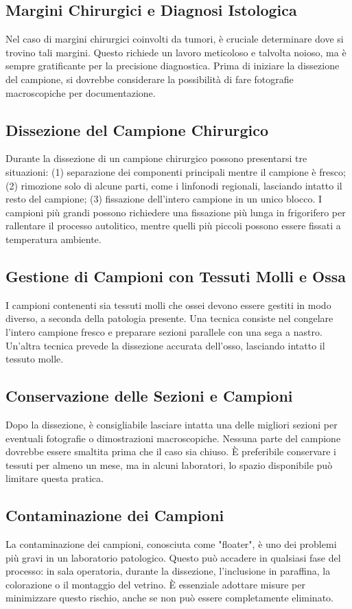 \subsection{Margini Chirurgici e Diagnosi Istologica}
Nel caso di margini chirurgici coinvolti da tumori, è cruciale determinare dove si trovino tali margini. Questo richiede un lavoro meticoloso e talvolta noioso, ma è sempre gratificante per la precisione diagnostica. Prima di iniziare la dissezione del campione, si dovrebbe considerare la possibilità di fare fotografie macroscopiche per documentazione.

\subsection{Dissezione del Campione Chirurgico}
Durante la dissezione di un campione chirurgico possono presentarsi tre situazioni: (1) separazione dei componenti principali mentre il campione è fresco; (2) rimozione solo di alcune parti, come i linfonodi regionali, lasciando intatto il resto del campione; (3) fissazione dell'intero campione in un unico blocco. I campioni più grandi possono richiedere una fissazione più lunga in frigorifero per rallentare il processo autolitico, mentre quelli più piccoli possono essere fissati a temperatura ambiente.

\subsection{Gestione di Campioni con Tessuti Molli e Ossa}
I campioni contenenti sia tessuti molli che ossei devono essere gestiti in modo diverso, a seconda della patologia presente. Una tecnica consiste nel congelare l'intero campione fresco e preparare sezioni parallele con una sega a nastro. Un'altra tecnica prevede la dissezione accurata dell'osso, lasciando intatto il tessuto molle.

\subsection{Conservazione delle Sezioni e Campioni}
Dopo la dissezione, è consigliabile lasciare intatta una delle migliori sezioni per eventuali fotografie o dimostrazioni macroscopiche. Nessuna parte del campione dovrebbe essere smaltita prima che il caso sia chiuso. È preferibile conservare i tessuti per almeno un mese, ma in alcuni laboratori, lo spazio disponibile può limitare questa pratica.

\subsection{Contaminazione dei Campioni}
La contaminazione dei campioni, conosciuta come "floater", è uno dei problemi più gravi in un laboratorio patologico. Questo può accadere in qualsiasi fase del processo: in sala operatoria, durante la dissezione, l'inclusione in paraffina, la colorazione o il montaggio del vetrino. È essenziale adottare misure per minimizzare questo rischio, anche se non può essere completamente eliminato.

